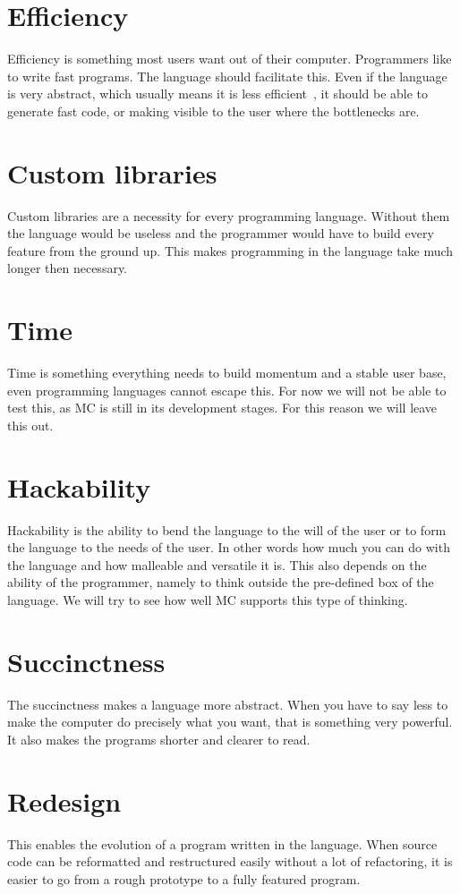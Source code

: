 \section{Efficiency}
Efficiency is something most users want out of their computer.
Programmers like to write fast programs.
The language should facilitate this.
Even if the language is very abstract, which usually means it is less efficient~\cite{graham2004hackers}, it should be able to generate fast code, or making visible to the user where the bottlenecks are.

\section{Custom libraries}
Custom libraries are a necessity for every programming language.
Without them the language would be useless and the programmer would have to build every feature from the ground up.
This makes programming in the language take much longer then necessary.

\section{Time}
Time is something everything needs to build momentum and a stable user base, even programming languages cannot escape this.
For now we will not be able to test this, as MC is still in its development stages.
For this reason we will leave this out.

\section{Hackability}
Hackability is the ability to bend the language to the will of the user or to form the language to the needs of the user.
In other words how much you can do with the language and how malleable and versatile it is.
This also depends on the ability of the programmer, namely to think outside the pre-defined box of the language.
We will try to see how well MC supports this type of thinking.

\section{Succinctness}
The succinctness makes a language more abstract.
When you have to say less to make the computer do precisely what you want, that is something very powerful.
It also makes the programs shorter and clearer to read.

\section{Redesign}
This enables the evolution of a program written in the language.
When source code can be reformatted and restructured easily without a lot of refactoring, it is easier to go from a rough prototype to a fully featured program.

